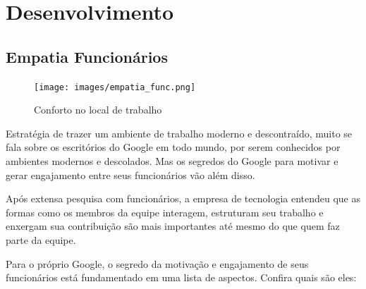 \documentclass[a4paper]{article}
\begin{document}
\vfill
\pagebreak


\section{Desenvolvimento}
\subsection{Empatia Funcionários}
\begin{figure}[h]
    \centering
    \texttt{[image: images/empatia\_func.png]}
    \caption{Conforto no local de trabalho}
\end{figure}

\par Estratégia de trazer um ambiente de trabalho moderno e descontraído, muito se fala sobre os escritórios do Google em todo mundo, por serem conhecidos por ambientes modernos e descolados. Mas os segredos do Google para motivar e gerar engajamento entre seus funcionários vão além disso.
\par Após extensa pesquisa com funcionários, a empresa de tecnologia entendeu que as formas como os membros da equipe interagem, estruturam seu trabalho e enxergam sua contribuição são mais importantes até mesmo do que quem faz parte da equipe.
\par Para o próprio Google, o segredo da motivação e engajamento de seus funcionários está fundamentado em uma lista de aspectos. Confira quais são eles: 
\end{document}
